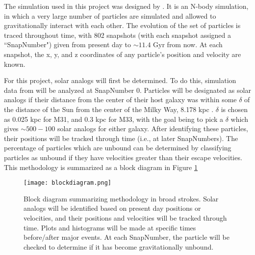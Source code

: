 \documentclass{aastex63}
\begin{document}
The simulation used in this project was designed by \cite{van12}. It is an N-body simulation, in which a very large number of particles are simulated and allowed to gravitationally interact with each other. The evolution of the set of particles is traced throughout time, with 802 snapshots (with each snapshot assigned a ``SnapNumber") given from present day to $\sim 11.4$ Gyr from now. At each snapshot, the x, y, and z coordinates of any particle's position and velocity are known.

For this project, solar analogs will first be determined. To do this, simulation data from \cite{van12} will be analyzed at SnapNumber 0. Particles will be designated as solar analogs if their distance from the center of their host galaxy was within some $\delta$ of the distance of the Sun from the center of the Milky Way, 8.178 kpc \citep{abuter19}. $\delta$ is chosen as 0.025 kpc for M31, and 0.3 kpc for M33, with the goal being to pick a $\delta$ which gives $\sim 500-100$ solar analogs for either galaxy. After identifying these particles, their positions will be tracked through time (i.e., at later SnapNumbers). The percentage of particles which are unbound can be determined by classifying particles as unbound if they have velocities greater than their escape velocities. This methodology is summarized as a block diagram in Figure \ref{blockdiagram}

\begin{figure}
    \centering
    \texttt{[image: blockdiagram.png]}
    \caption{Block diagram summarizing methodology in broad strokes. Solar analogs will be identified based on present day positions or velocities, and their positions and velocities will be tracked through time. Plots and histograms will be made at specific times before/after major events. At each SnapNumber, the particle will be checked to determine if it has become gravitationally unbound.}
    \label{blockdiagram}
\end{figure}
\end{document}
